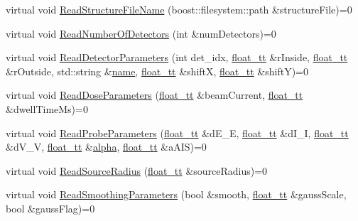 \begin{DoxyCompactItemize}
\item 
virtual void \hyperlink{class_q_s_t_e_m_1_1_i_config_reader_ab8e06ef8edcf8f87219c91f9fce4ee2a}{Read\-Structure\-File\-Name} (boost\-::filesystem\-::path \&structure\-File)=0
\item 
virtual void \hyperlink{class_q_s_t_e_m_1_1_i_config_reader_a0acaa9f8dcde9ceee37c376d9cfc55d7}{Read\-Number\-Of\-Detectors} (int \&num\-Detectors)=0
\item 
virtual void \hyperlink{class_q_s_t_e_m_1_1_i_config_reader_ae47930447b319fd3b7029b7da484b73c}{Read\-Detector\-Parameters} (int det\-\_\-idx, \hyperlink{namespace_q_s_t_e_m_a915d7caa497280d9f927c4ce8d330e47}{float\-\_\-tt} \&r\-Inside, \hyperlink{namespace_q_s_t_e_m_a915d7caa497280d9f927c4ce8d330e47}{float\-\_\-tt} \&r\-Outside, std\-::string \&\hyperlink{qmb_8m_abdc1dcc6fed70c14f9b5ae237e486f4e}{name}, \hyperlink{namespace_q_s_t_e_m_a915d7caa497280d9f927c4ce8d330e47}{float\-\_\-tt} \&shift\-X, \hyperlink{namespace_q_s_t_e_m_a915d7caa497280d9f927c4ce8d330e47}{float\-\_\-tt} \&shift\-Y)=0
\item 
virtual void \hyperlink{class_q_s_t_e_m_1_1_i_config_reader_abf819320fea57158d7fb758457b79bcd}{Read\-Dose\-Parameters} (\hyperlink{namespace_q_s_t_e_m_a915d7caa497280d9f927c4ce8d330e47}{float\-\_\-tt} \&beam\-Current, \hyperlink{namespace_q_s_t_e_m_a915d7caa497280d9f927c4ce8d330e47}{float\-\_\-tt} \&dwell\-Time\-Ms)=0
\item 
virtual void \hyperlink{class_q_s_t_e_m_1_1_i_config_reader_a64daf87fe1ea9623e1bd3b7a814f371c}{Read\-Probe\-Parameters} (\hyperlink{namespace_q_s_t_e_m_a915d7caa497280d9f927c4ce8d330e47}{float\-\_\-tt} \&d\-E\-\_\-\-E, \hyperlink{namespace_q_s_t_e_m_a915d7caa497280d9f927c4ce8d330e47}{float\-\_\-tt} \&d\-I\-\_\-\-I, \hyperlink{namespace_q_s_t_e_m_a915d7caa497280d9f927c4ce8d330e47}{float\-\_\-tt} \&d\-V\-\_\-\-V, \hyperlink{namespace_q_s_t_e_m_a915d7caa497280d9f927c4ce8d330e47}{float\-\_\-tt} \&\hyperlink{virtual_goniometer_8m_a62197192f0fbf4e0675eb37be1c4c175}{alpha}, \hyperlink{namespace_q_s_t_e_m_a915d7caa497280d9f927c4ce8d330e47}{float\-\_\-tt} \&a\-A\-I\-S)=0
\item 
virtual void \hyperlink{class_q_s_t_e_m_1_1_i_config_reader_a159055d6123e918d70d4faa0e2fe2948}{Read\-Source\-Radius} (\hyperlink{namespace_q_s_t_e_m_a915d7caa497280d9f927c4ce8d330e47}{float\-\_\-tt} \&source\-Radius)=0
\item 
virtual void \hyperlink{class_q_s_t_e_m_1_1_i_config_reader_a6c5cc6da68dd058b0c4fd8cebd8781c2}{Read\-Smoothing\-Parameters} (bool \&smooth, \hyperlink{namespace_q_s_t_e_m_a915d7caa497280d9f927c4ce8d330e47}{float\-\_\-tt} \&gauss\-Scale, bool \&gauss\-Flag)=0

\end{DoxyCompactItemize}
